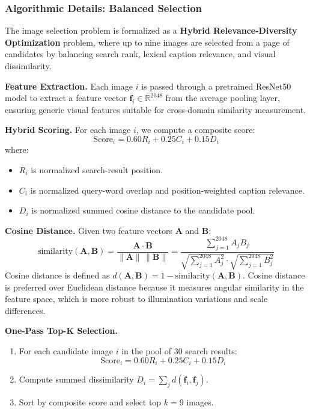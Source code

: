 \documentclass[12pt, letterpaper]{article}
\begin{document}
\subsubsection{Algorithmic Details: Balanced Selection}

The image selection problem is formalized as a \textbf{Hybrid Relevance-Diversity Optimization}
problem, where up to nine images are selected from a page of candidates by balancing
search rank, lexical caption relevance, and visual dissimilarity.

\textbf{Feature Extraction.} Each image $i$ is passed through a pretrained ResNet50
model \cite{he2016deep} to extract a feature vector $\mathbf{f}_i \in \mathbb{R}^{2048}$ from the average pooling
layer, ensuring generic visual features suitable for cross-domain similarity measurement.

\textbf{Hybrid Scoring.} For each image $i$, we compute a composite score:
\begin{equation}
  \text{Score}_i = 0.60R_i + 0.25C_i + 0.15D_i
\end{equation}
where:
\begin{itemize}
  \item $R_i$ is normalized search-result position.
  \item $C_i$ is normalized query-word overlap and position-weighted caption relevance.
  \item $D_i$ is normalized summed cosine distance to the candidate pool.
\end{itemize}

\textbf{Cosine Distance.} Given two feature vectors $\mathbf{A}$ and $\mathbf{B}$:
\begin{equation}
  \text{similarity}(\mathbf{A}, \mathbf{B})
  = \frac{\mathbf{A} \cdot \mathbf{B}}{\|\mathbf{A}\|\,\|\mathbf{B}\|}
  = \frac{\displaystyle\sum_{j=1}^{2048} A_j B_j}
         {\displaystyle\sqrt{\sum_{j=1}^{2048} A_j^2}\cdot\sqrt{\sum_{j=1}^{2048} B_j^2}}
\end{equation}
Cosine distance is defined as $d(\mathbf{A},\mathbf{B}) = 1 - \text{similarity}(\mathbf{A},\mathbf{B})$.
Cosine distance is preferred over Euclidean distance because it measures angular similarity
in the feature space, which is more robust to illumination variations and scale differences.

\textbf{One-Pass Top-K Selection.}
\begin{enumerate}
  \item For each candidate image $i$ in the pool of 30 search results:
    \begin{equation}
      \text{Score}_i = 0.60R_i + 0.25C_i + 0.15D_i
    \end{equation}
  \item Compute summed dissimilarity $D_i = \sum_j d(\mathbf{f}_i, \mathbf{f}_j)$.
  \item Sort by composite score and select top $k=9$ images.
\end{enumerate}
\end{document}
